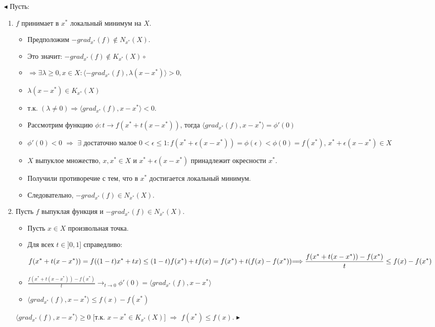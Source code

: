 \noindent$\blacktriangleleft$ Пусть:
\begin{enumerate}
    \item $f$ принимает в $x^*$ локальный минимум на $X$.\\
\begin{itemize}
\item Предположим  $-grad_{x^*}(f) \notin N_{x^*}(X)$.
\item Это значит: $-grad_{x^*}(f) \notin K_{x^*}(X)\circ$
\item $\Longrightarrow \exists \lambda \geq 0, x \in X: \langle -grad_{x^*}(f), \lambda (x-x^*)\rangle > 0,$
\item $\lambda (x-x^*) \in K_{x^*}(X)$
\item т.к. $(\lambda \neq 0) \Longrightarrow \langle grad_{x^*}(f),x-x^*\rangle < 0$.
\item Рассмотрим функцию $\phi: t \rightarrow f(x^* + t(x - x^*))$, тогда $\langle grad_{x^*}(f),x-x^*\rangle = \phi '(0)$
\item $\phi '(0) < 0$ $\Rightarrow$ $\exists$ достаточно малое $0<\epsilon \leq 1 : f(x^{*}+\epsilon (x-x^{*}))= \phi(\epsilon) < \phi(0) = f(x^{*})$, $x^* + \epsilon(x - x^*) \in X$
\item $X$ выпуклое множество, $x,x^{*} \in X$ и $x^{*} + \epsilon(x-x^{*})$ принадлежит окресности $x^{*}$.
\item Получили противоречие с тем, что в $x^{*}$ достигается локальный минимум.
\item Следовательно, $-grad_{x^*}(f) \in N_{x^*}(X)$.
\end{itemize}
    \item Пусть $f$ выпуклая функция и $-grad_{x^{*}}(f) \in N_{x^{*}}(X)$.\\
\begin{itemize}
\item Пусть $x \in X$ произвольная точка.
\item Для всех $t \in ]0,1]$ справедливо:
\begin{equation*}
f(x^{*} + t(x - x^{*})) = f((1 - t)x^{*} + t x) \leq (1 - t)f(x^{*}) + t f(x) = f(x^{*}) + t(f(x) - f(x^{*})) $$\\$$
\Longrightarrow \displaystyle\frac{f(x^{*} + t(x - x^{*})) - f(x^{*})}{t} \leq f(x) - f(x^{*})
\end{equation*}
\item $\displaystyle\frac{f(x^{*} + t(x - x^{*})) - f(x^{*})}{t} \displaystyle\rightarrow_{t\rightarrow 0} \phi '(0) = \langle grad_{x^{*}}(f),x - x^{*} \rangle$
\item $\langle grad_{x^{*}}(f),x - x^{*} \rangle \leq f(x) -f(x^{*})$
\end{itemize}
$\langle grad_{x^{*}}(f),x - x^{*} \rangle \geq 0$ [т.к. $x - x^{*} \in K_{x^{*}}(X)$] $\Rightarrow$ $f(x^{*}) \leq f(x)$. $\blacktriangleright$\\
\end{enumerate}


